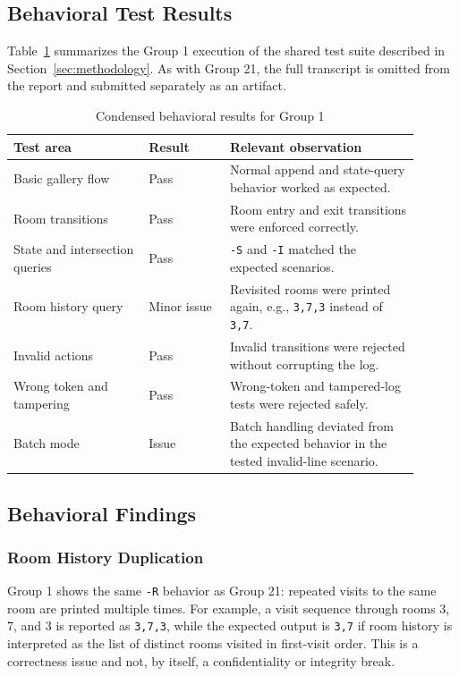 \documentclass[a4paper, 12pt]{article}
\begin{document}
    \subsection{Behavioral Test Results}
    Table~\ref{tab:g1-behavioral-results} summarizes the Group 1 execution of the shared test suite described in Section~\ref{sec:methodology}. As with Group 21, the full transcript is omitted from the report and submitted separately as an artifact.

    \begin{table}[H]
        \centering
        \small
        \begin{tabular}{p{0.30\linewidth}p{0.18\linewidth}p{0.42\linewidth}}
            \toprule
            \textbf{Test area} & \textbf{Result} & \textbf{Relevant observation} \\
            \midrule
            Basic gallery flow & Pass & Normal append and state-query behavior worked as expected. \\
            Room transitions & Pass & Room entry and exit transitions were enforced correctly. \\
            State and intersection queries & Pass & \texttt{-S} and \texttt{-I} matched the expected scenarios. \\
            Room history query & Minor issue & Revisited rooms were printed again, e.g., \texttt{3,7,3} instead of \texttt{3,7}. \\
            Invalid actions & Pass & Invalid transitions were rejected without corrupting the log. \\
            Wrong token and tampering & Pass & Wrong-token and tampered-log tests were rejected safely. \\
            Batch mode & Issue & Batch handling deviated from the expected behavior in the tested invalid-line scenario. \\
            \bottomrule
        \end{tabular}
        \caption{Condensed behavioral results for Group 1}
        \label{tab:g1-behavioral-results}
    \end{table}

    \subsection{Behavioral Findings}
    \subsubsection{Room History Duplication}
    Group 1 shows the same \texttt{-R} behavior as Group 21: repeated visits to the same room are printed multiple times. For example, a visit sequence through rooms 3, 7, and 3 is reported as \texttt{3,7,3}, while the expected output is \texttt{3,7} if room history is interpreted as the list of distinct rooms visited in first-visit order. This is a correctness issue and not, by itself, a confidentiality or integrity break.
\end{document}
